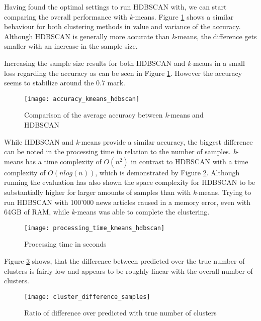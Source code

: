 Having found the optimal settings to run HDBSCAN with, we can start comparing the overall performance with \textit{k}-means. Figure \ref{fig:accuracy_kmeans_hdbscan} shows  a similar behaviour for both clustering methods in value and variance of the accuracy. Although HDBSCAN is generally more accurate than \textit{k}-means, the difference gets smaller with an increase in the sample size. 

Increasing the sample size results for both HDBSCAN and \textit{k}-means in a small loss regarding the accuracy as can be seen in Figure \ref{fig:accuracy_kmeans_hdbscan}. However the accuracy seems to stabilize around the 0.7 mark.

\begin{figure}[h]
    \centering
    \texttt{[image: accuracy\_kmeans\_hdbscan]}
    \caption{Comparison of the average accuracy between \textit{k}-means and HDBSCAN}
    \label{fig:accuracy_kmeans_hdbscan}
\end{figure}

While HDBSCAN and \textit{k}-means provide a similar accuracy, the biggest difference can be noted in the processing time in relation to the number of samples. \textit{k}-means has a time complexity of $O(n^2)$ in contrast to HDBSCAN with a time complexity of $O(nlog(n))$, which is demonstrated by Figure \ref{fig:processing_time_kmeans_hdbscan}. Although running the evaluation has also shown the space complexity for HDBSCAN to be substantially higher for larger amounts of samples than with \textit{k}-means. Trying to run HDBSCAN with 100'000 news articles caused in a memory error, even with 64GB of RAM, while \textit{k}-means was able to complete the clustering.


\begin{figure}[h]
    \centering
    \texttt{[image: processing\_time\_kmeans\_hdbscan]}
    \caption{Processing time in seconds }
    \label{fig:processing_time_kmeans_hdbscan}
\end{figure}

Figure \ref{fig:cluster_difference_samples} shows, that the difference between predicted over the true number of clusters is fairly low and appears to be roughly linear with the overall number of clusters.  

\begin{figure}[h]
    \centering
    \texttt{[image: cluster\_difference\_samples]}
    \caption{Ratio of difference over predicted with true number of clusters}
    \label{fig:cluster_difference_samples}
\end{figure}

